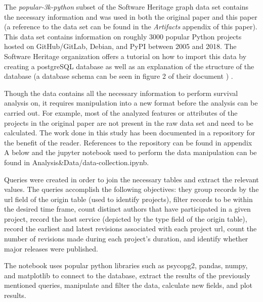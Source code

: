\documentclass[acmconf]{acmart}
\begin{document}
The \emph{popular-3k-python} subset of the Software Heritage graph data set \cite{pietri2019software} contains the necessary information and was used in both the original paper and this paper (a reference to the data set can be found in the \emph{Artifacts} appendix of this paper).
This data set  contains information on roughly 3000 popular Python projects hosted on GitHub/GitLab, Debian, and PyPI between 2005 and 2018.
The Software Heritage organization offers a tutorial on how to import this data by creating a postgreSQL database \cite{SQLdataset} as well as an explanation of the structure of the database (a database schema can be seen in figure 2 of their document \cite{pietri2019software}) .

Though the data contains all the necessary information to perform survival analysis on, it requires manipulation into a new format before the analysis can be carried out. 
For example, most of the analyzed features or attributes of the projects in the original paper are not present in the raw data set and need to be calculated.
The work done in this study has been documented in a repository for the benefit of the reader.
References to the repository can be found in appendix A below and the jupyter notebook used to perform the data manipulation can be found in Analysis\&Data/data-collection.ipynb. 

Queries were created in order to join the necessary tables and extract the relevant values.
The queries accomplish the following objectives: they group records by the url field of the origin table (used to identify projects), filter records to be within the desired time frame, count distinct authors that have participated in a given project, record the host service (depicted by the type field of the origin table), record the earliest and latest revisions associated with each project url, count the number of revisions made during each project's duration, and identify whether major releases were published.

The notebook uses popular python libraries such as psycopg2, pandas, numpy, and matplotlib to connect to the database, extract the results of the previously mentioned queries, manipulate and filter the data, calculate new fields, and plot results. 
\end{document}
